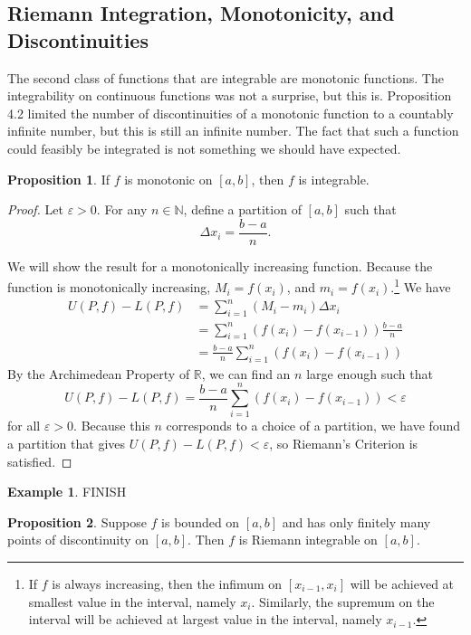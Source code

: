 \documentclass{article}
\newcommand{\N}{\mathbb{N}}
\newcommand{\R}{\mathbb{R}}
\theoremstyle{definition}
\newtheorem{proposition}{Proposition}[section]
\newtheorem{example}{Example}[section]
\begin{document}
	\subsection{Riemann Integration, Monotonicity, and Discontinuities}
	The second class of functions that are integrable are monotonic functions. The integrability on continuous functions was not a surprise, but this is. Proposition 4.2 limited the number of discontinuities of a monotonic function to a countably infinite number, but this is still an infinite number. The fact that such a function could feasibly be integrated is not something we should have expected. 
	\begin{proposition}
		If $ f $ is monotonic on $ [a,b] $, then $ f $ is integrable. 
	\end{proposition}
	\begin{proof}
		Let $ \varepsilon>0 $. For any $ n\in\N $, define a partition of $ [a,b] $ such that $$ \Delta x_i=\frac{b-a}{n}.$$
		
		We will show the result for a monotonically increasing function. Because the function is monotonically increasing, $ M_i=f(x_i) $, and $ m_i=f(x_i) $.\footnote{If $ f $ is always increasing, then the infimum on $ [x_{i-1},x_i] $ will be achieved at  smallest value in the interval, namely $ x_i $. Similarly, the supremum on the interval will be achieved at  largest value in the interval, namely $ x_{i-1} $.} We have \begin{align*}
			U(P,f)-L(P,f)&=\sum_{i=1}^{n}(M_i-m_i)\Delta x_i\\&=\sum_{i=1}^{n}(f(x_i)-f(x_{i-1}))\frac{b-a}{n}\\&=\frac{b-a}{n}\sum_{i=1}^{n}(f(x_i)-f(x_{i-1}))
		\end{align*}
		By the Archimedean Property of $ \R $, we can find an $ n $ large enough such that $$U(P,f)-L(P,f)=\frac{b-a}{n}\sum_{i=1}^{n}(f(x_i)-f(x_{i-1}))<\varepsilon $$ for all $ \varepsilon>0 $. Because this $ n $ corresponds to a choice of a partition, we have found a partition that gives $ U(P,f)-L(P,f)<\varepsilon$, so Riemann's Criterion is satisfied. 
	\end{proof}
	\begin{example}
		{\color{red}FINISH} 
		
	\end{example}
	
	\begin{proposition}
		Suppose $ f $ is bounded on $ [a,b] $ and has only finitely many points of discontinuity on $ [a,b] $. Then $ f $ is Riemann integrable on $ [a,b] $.
	\end{proposition}
	
\end{document}
